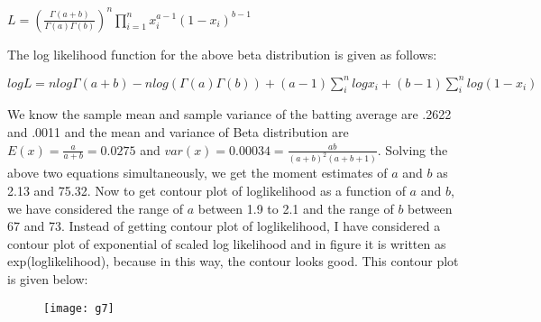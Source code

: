 \documentclass[10pt]{article}
\begin{document}
\begin{newpage}
$L=(\frac{\Gamma(a+b)}{\Gamma(a)\Gamma(b)})^n\prod_{i=1}^{n}x_{i}^{a-1}(1-x_{i})^{b-1}$

The log likelihood function for the above beta distribution is given as follows:

$logL=nlog\Gamma(a+b)-nlog(\Gamma(a)\Gamma(b))+(a-1)\sum_{i}^{n}logx_{i}+(b-1)\sum_{i}^{n}log(1-x_{i})$

We know the sample mean and sample variance of the batting average are .2622 and .0011 and the mean and variance of Beta distribution are $E(x)=\frac{a}{a+b}=0.0275$ and $var(x)=0.00034=\frac{ab}{(a+b)^2(a+b+1)}$. Solving the above two equations simultaneously, we get the moment estimates of $a$ and $b$ as 2.13 and 75.32. Now to get contour plot of loglikelihood as a function of $a$ and $b$, we have considered the range of $a$ between 1.9 to 2.1 and the range of $b$ between 67 and 73. Instead of getting contour plot of loglikelihood, I have considered a contour plot of exponential of scaled log likelihood and in figure it is written as exp(loglikelihood), because in this way, the contour looks good. This contour plot is given below:
\begin{newpage}
\begin{figure}[h]
\begin{center}
\texttt{[image: g7]}
\end{center}
\end{figure}


\end{newpage}
\end{newpage}
\end{document}
